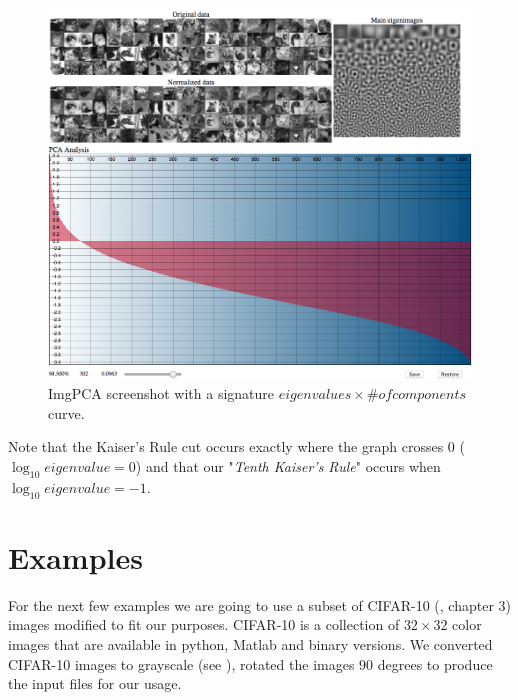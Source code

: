 \documentclass{article} %
\begin{document}

\begin{figure}[h]
\begin{center}
\includegraphics[width=\textwidth]{imgPca.png}
\end{center}
\caption{ImgPCA screenshot with a signature $eigenvalues \times \#of components$ curve.}
\end{figure}
Note that the Kaiser's Rule cut occurs exactly where the graph crosses $0$ ($\log_{10} eigenvalue = 0$) and that our "\emph{Tenth Kaiser's Rule}" occurs when $\log_{10} eigenvalue = -1$.
\section{Examples}
For the next few examples we are going to use a subset of CIFAR-10 (\citet{krizhevsky2009learning}, chapter 3) images modified to fit our purposes. CIFAR-10 is a collection of $32\times 32$ color images that are available in python, Matlab and binary versions. We converted CIFAR-10 images to grayscale (see ), rotated the images $90$ degrees to produce the input files for our usage.\par
\end{document}
